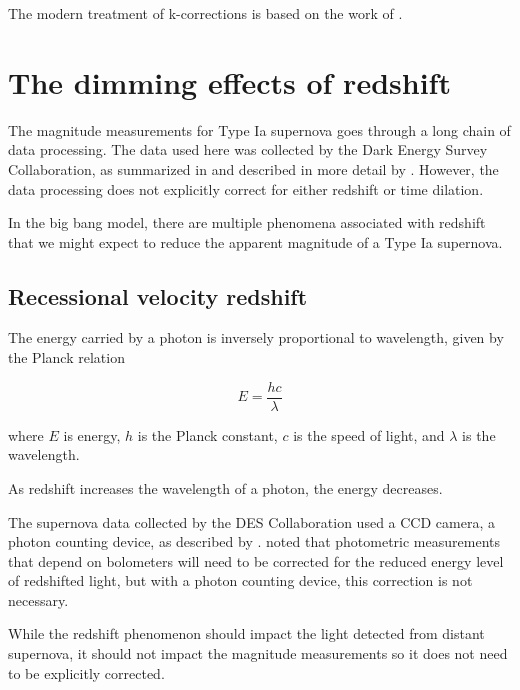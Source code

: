 \documentclass{article}
\begin{document}
The modern treatment of k-corrections is based on the work of \citet{kim1996}.



\section{The dimming effects of redshift}
\label{sec:redshift}

The magnitude measurements for Type Ia supernova goes through a long chain of
data processing. The data used here was collected by the Dark Energy Survey
Collaboration, as summarized in \citet{abbott2024} and described in more detail
by \citet{vincenzi2024}. However, the data processing does not explicitly
correct for either redshift or time dilation.

In the big bang model, there are multiple phenomena associated with redshift that we
might expect to reduce the apparent magnitude of a Type Ia supernova.

\subsection{Recessional velocity redshift}

The energy carried by a photon is inversely proportional to wavelength, given
by the Planck relation

\begin{equation}
  E = \frac{hc}{\lambda}
\end{equation}

where $E$ is energy, $h$ is the Planck constant, $c$ is the speed of light, and
$\lambda$ is the wavelength.

As redshift increases the wavelength of a photon, the energy decreases.

The supernova data collected by the DES Collaboration used a CCD camera, a
photon counting device, as described by \citet{flaugher2015}.  \citet{kim1996}
noted that photometric measurements that depend on bolometers will need to be
corrected for the reduced energy level of redshifted light, but with a photon
counting device, this correction is not necessary.

While the redshift phenomenon should impact the light detected from distant
supernova, it should not impact the magnitude measurements so it does not need
to be explicitly corrected.
\end{document}
